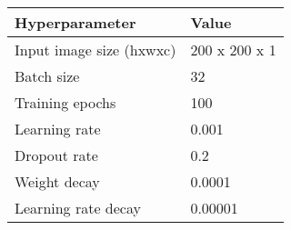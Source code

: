 \begin{table}[H]
	\centering
	\begin{tabular}{|l|l|}
		\hline
		\textbf{Hyperparameter} & \textbf{Value}                                                                                                                                                                                                                            \\ \hline
		Input image size (hxwxc)                 & 200 x 200 x 1                                                                                                                                                                                                                                              \\ \hline
		Batch size                               & 32                                                                                                                                                                                                                                                         \\ \hline
		Training epochs                          & 100                                                                                                                                                                                                                                                        \\ \hline
		Learning rate                            & 0.001                                                                                                                                                                                                                                                      \\ \hline
		Dropout rate                             & 0.2                                                                                                                                                                                                                                                        \\ \hline
		Weight decay                             & 0.0001                                                                                                                                                                                                                                                     \\ \hline
		Learning rate decay                      & 0.00001                                                                                                                                                                                                                                                    \\ \hline

\end{tabular}
\end{table}
